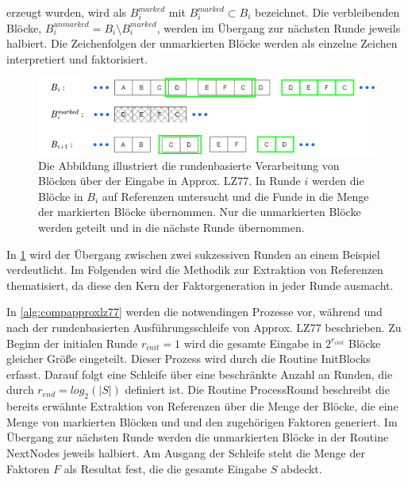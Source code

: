 erzeugt wurden, wird als $B_i^{marked}$ mit $B_i^{marked}\subset B_i$ bezeichnet. Die verbleibenden Blöcke, $B_i^{unmarked}=B_i\setminus B_i^{marked}$, werden im Übergang
zur nächsten Runde jeweils halbiert. Die Zeichenfolgen der unmarkierten Blöcke werden als einzelne Zeichen interpretiert und faktorisiert.
\begin{figure} [h]
    \centering
    \includegraphics[width=1\textwidth]{Images/approxlz77.png}
    \caption{Die Abbildung illustriert die rundenbasierte Verarbeitung von Blöcken über der Eingabe in Approx. LZ77. In Runde $i$ werden die Blöcke in $B_i$ auf Referenzen untersucht und
    die Funde in die Menge der markierten Blöcke übernommen. Nur die unmarkierten Blöcke werden geteilt und in die nächste Runde übernommen.}
    \label{fig:roundapproxlz77}
\end{figure}

In \ref{fig:roundapproxlz77} wird der Übergang zwischen zwei sukzessiven Runden an einem Beispiel verdeutlicht. Im Folgenden wird die Methodik zur Extraktion von Referenzen
thematisiert, da diese den Kern der Faktorgeneration in jeder Runde ausmacht.

In \ref{alg:compapproxlz77} werden die notwendingen Prozesse vor, während und nach der rundenbasierten Ausführungsschleife von Approx. LZ77 beschrieben. Zu Beginn der initialen
Runde $r_{init}=1$ wird die gesamte Eingabe in $2^{r_{init}}$ Blöcke gleicher Größe eingeteilt. Dieser Prozess wird durch die Routine InitBlocks erfasst. Darauf folgt eine Schleife
über eine beschränkte Anzahl an Runden, die durch $r_{end}=log_2(|S|)$ definiert ist. Die Routine ProcessRound beschreibt die bereits erwähnte Extraktion von Referenzen über die
Menge der Blöcke, die eine Menge von markierten Blöcken und und den zugehörigen Faktoren generiert. Im Übergang zur nächsten Runde werden die unmarkierten Blöcke in der Routine 
NextNodes jeweils halbiert. Am Ausgang der Schleife steht die Menge der Faktoren $F$ als Resultat fest, die die gesamte Eingabe $S$ abdeckt.

